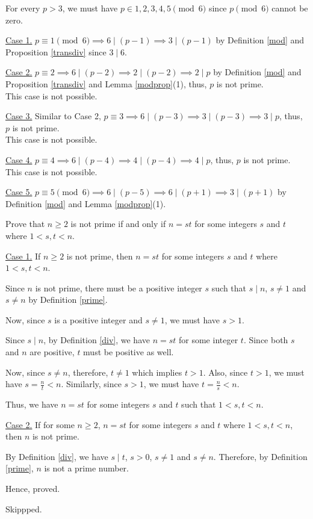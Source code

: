 	For every $p > 3$, we must have $p \in {1, 2, 3, 4, 5} \pmod{6}$ since $p \pmod{6}$ cannot be zero.

	\underline{Case 1.} $p \equiv 1 \pmod{6} \implies 6 \mid (p-1) \implies 3 \mid (p-1)$ by Definition \ref{mod} and Proposition \ref{transdiv} since $3 \mid 6$.
	
	\underline{Case 2.} $p \equiv 2 \implies 6 \mid (p-2) \implies 2 \mid (p-2) \implies 2 \mid p$ by Definition \ref{mod} and Proposition \ref{transdiv} and Lemma \ref{modprop}(1), thus, $p$ is not prime. \\
	This case is not possible.

	\underline{Case 3.} Similar to Case 2, $p \equiv 3 \implies 6 \mid (p-3) \implies 3 \mid (p-3) \implies 3 \mid p$, thus, $p$ is not prime. \\
	This case is not possible.

	\underline{Case 4.} $p \equiv 4 \implies 6 \mid (p-4) \implies 4 \mid (p-4) \implies 4 \mid p$, thus, $p$ is not prime. \\
	This case is not possible.

	\underline{Case 5.} $p \equiv 5 \pmod{6} \implies 6 \mid (p-5) \implies 6 \mid (p+1) \implies 3 \mid (p+1)$ by Definition \ref{mod} and Lemma \ref{modprop}(1).
\es

\bp 
	Prove that $n \geq 2$ is not prime if and only if $n = st$ for some integers $s$ and $t$ where $1 < s, t < n$.
\ep 

\bs
	\underline{Case 1.} If $n \geq 2$ is not prime, then $n = st$ for some integers $s$ and $t$ where $1 < s, t < n$.
	
	Since $n$ is not prime, there must be a positive integer $s$ such that $s \mid n$, $s \neq 1$ and $s \neq n$ by Definition \ref{prime}.

	Now, since $s$ is a positive integer and $s \neq 1$, we must have $s > 1$.

	Since $s \mid n$, by Definition \ref{div}, we have $n = st$ for some integer $t$. Since both $s$ and $n$ are positive, $t$ must be positive as well.

	Now, since $s \neq n$, therefore, $t \neq 1$ which implies $t > 1$. Also, since $t > 1$, we must have $s = \frac{n}{t} < n$. 
	Similarly, since $s > 1$, we must have $t = \frac{n}{s} < n$. 

	Thus, we have $n = st$ for some integers $s$ and $t$ such that $1 < s,t < n$.

	\underline{Case 2.} If for some $n \geq 2$, $n = st$ for some integers $s$ and $t$ where $1 < s, t < n$, then $n$ is not prime.

	By Definition \ref{div}, we have $s \mid t$, $s > 0$, $s \neq 1$ and $s \neq n$. Therefore, by Definition \ref{prime}, $n$ is not a prime number.


	Hence, proved.
\es

\bp Skippped.\ep 
